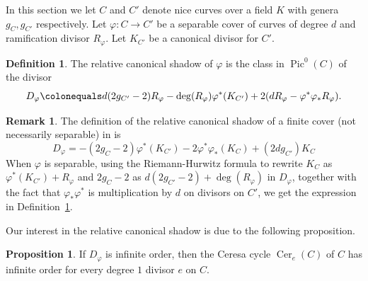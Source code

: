\documentclass[reqno,10pt]{amsart}
\theoremstyle{definition}
\theoremstyle{definition}
\newtheorem{prop}[thm]{Proposition}
\newtheorem{defn}[thm]{Definition}
\newtheorem{rem}[thm]{Remark}
\DeclareMathOperator{\Pic}{Pic}
\newcommand{\Cer}{\operatorname{Cer}}
\begin{document}
In this section we let $C$ and $C'$ denote nice curves over a field $K$ with genera $g_C,g_{C'}$ respectively. Let $\varphi \colon C \rightarrow C'$ be a separable cover of curves of degree $d$ and ramification divisor $R_{\varphi}$. Let $K_{C'}$ be a canonical divisor for $C'$.
\begin{defn}\label{D:RCShadow} \cite[Definition~5.1]{ELS}  
 The relative canonical shadow of $\varphi$ is the class in $\Pic^0(C)$ of the divisor 
\[ D_{\varphi} \colonequals d (2g_{C'}-2)R_{\varphi}-\deg(R_{\varphi}) \varphi^{*}(K_{C'}) + 2(dR_{\varphi}-\varphi^*\varphi_*R_{\varphi}).\]
\end{defn}




\begin{rem}
The definition of the relative canonical shadow of a finite cover (not necessarily separable) in \cite[Definition~5.1]{ELS} is 
\begin{equation}\label{eqn:ELSformula} D_{\varphi} = -(2g_C - 2)\varphi^*(K_{C'}) - 2\varphi^*\varphi_*(K_C) + (2dg_{C'})K_C \end{equation}
When $\varphi$ is separable, using the Riemann-Hurwitz formula to rewrite $K_C$ as $\varphi^*(K_{C'})+{R_{\varphi}}$ and $2g_C-2$ as $d(2g_{C'}-2) + \deg(R_{\varphi})$ in $D_{\varphi}$, together with the fact that $\varphi_* \varphi^*$ is multiplication by $d$ on divisors on $C'$, we get the expression in Definition~\ref{D:RCShadow}.
\end{rem}



Our interest in the relative canonical shadow is due to the following proposition.
\begin{prop}\label{prop:rcsceresa}\cite[Lemma~2.3, Remark~9, Lemma~5.2]{ELS}
If $D_{\varphi}$ is infinite order, then the Ceresa cycle $\Cer_e(C)$ of $C$ has infinite order for every degree $1$ divisor $e$ on $C$.
\end{prop}
\end{document}
